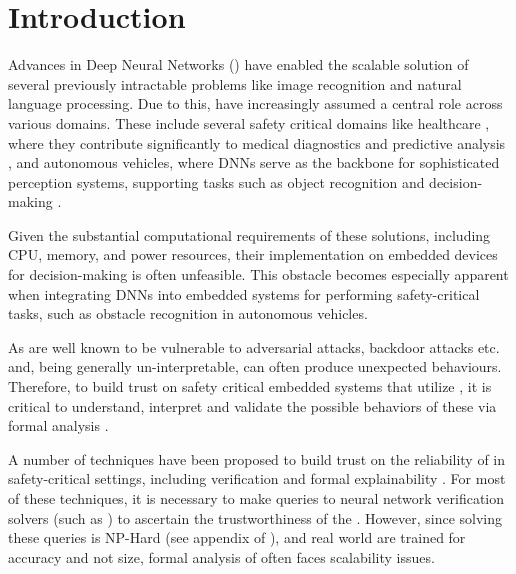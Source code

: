 
\section{Introduction}


Advances in Deep Neural Networks (\dnn) have enabled the scalable solution
of several previously intractable problems like image recognition and natural
language processing. Due to this, \dnn have increasingly assumed a central
role across various domains. These include several safety critical domains like
healthcare \cite{b1}, where they contribute significantly to medical diagnostics
and predictive analysis \cite{b2}, and autonomous vehicles, where DNNs serve as
the backbone for sophisticated perception systems, supporting tasks such as
object recognition and decision-making \cite{b3}. 

Given the substantial computational requirements of these \dnn solutions, 
including CPU, memory, and power resources, their implementation on embedded 
devices for decision-making is often unfeasible. 
This obstacle becomes especially apparent when integrating DNNs into 
embedded systems for performing safety-critical tasks, such as obstacle 
recognition in autonomous vehicles.

As \dnn are well known to be vulnerable to adversarial
attacks\cite{l-bfgs, fgsm, deep-fool, pgd, ground-truth-adv-attack, cw-attack},
backdoor attacks \cite{backdoor-poisoning} etc.  and, being generally
un-interpretable, can often produce 
unexpected behaviours. Therefore, to build trust on safety critical embedded systems 
that utilize \dnn, it is  critical to understand, interpret 
and validate the possible behaviors of these \dnn via formal analysis
\cite{overview-fxai, minimal-image-fxai, backdoor-verification, nn-lander-verif,
camera-verif-dsouza, generalization-verif}.

A number of techniques have been proposed to build trust on the reliability
of \dnn in safety-critical settings, including verification \cite{reluplex,
deeppoly, crown, beta-crown, cegar-nn}  and formal
explainability \cite{overview-fxai, minimal-image-fxai}. For most of these
techniques, it is necessary to make queries to neural
network verification solvers (such as \cite{reluplex, beta-crown}) to ascertain
the trustworthiness of the \dnn.
 However, since solving these queries is NP-Hard (see appendix of
\cite{reluplex}), and real world \dnn are trained for accuracy and not 
size, formal analysis of \dnn often faces scalability issues.

